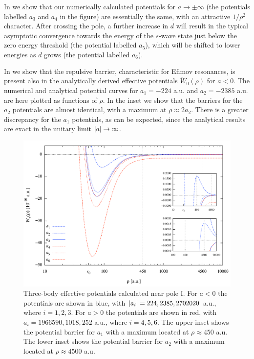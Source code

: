 In  we show that our numerically calculated potentials for $a \rightarrow \pm \infty$ (the potentials labelled $a_3$ and $a_4$ in the figure) are essentially the same, with an attractive $1/\rho^2$ character. After crossing the pole, a further increase in $d$ will result in the typical asymptotic convergence towards the energy of the $s$-wave state just below the zero energy threshold (the potential labelled $a_5$), which will be shifted to lower energies as $d$ grows (the potential labelled $a_6$).  

In  we show that the repulsive barrier, characteristic for Efimov resonances, is present also in the analytically derived effective potentials $\widetilde{W}_0(\rho)$ for $a<0$. The numerical and analytical potential curves for $a_1=-224$ a.u. and $a_2=-2385$ a.u. are here plotted as functions of $\rho$. In the inset we show that the barriers for the $a_2$ potentials are almost identical, with a maximum at $\rho \approx 2a_2$. There is a greater discrepancy for the $a_1$ potentials, as can be expected, since the analytical results are exact in the unitary limit $\lvert a\rvert \rightarrow \infty$.

\begin{figure}
	\includegraphics[width=\linewidth]{barrier.pdf}
	\caption{Three-body effective potentials calculated near pole $\mathrm{I}$. For $a<0$ the potentials are shown in blue, with $\lvert a_i\rvert=224,2385,2702020$ a.u., where $i=1,2,3$. For $a>0$ the potentials are shown in red, with $a_i=1966590,1018,252$ a.u., where $i=4,5,6$. The upper inset shows the potential barrier for $a_1$ with a maximum located at $\rho \approx 450$ a.u. The lower inset shows the potential barrier for $a_2$ with a maximum located at $\rho \approx 4500$ a.u.}
	\label{fig:barrier}
\end{figure}

